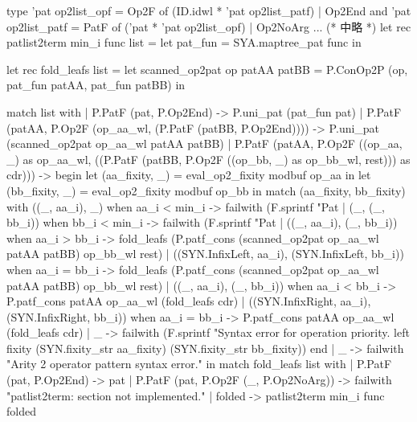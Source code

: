 \documentclass[mingoth,a4paper]{jsarticle}
\begin{document}
\begin{commandline}
  type 'pat op2list_opf =
      Op2F of (ID.idwl * 'pat op2list_patf)
    | Op2End
  and 'pat op2list_patf =
      PatF of ('pat * 'pat op2list_opf)
    | Op2NoArg
  ... (* 中略 *)
  let rec patlist2term min_i func list =
    let pat_fun = SYA.maptree_pat func in

    let rec fold_leafs list =
      let scanned_op2pat op patAA patBB =
        P.ConOp2P (op,
                   pat_fun patAA,
                   pat_fun patBB) in
        
        match list with
          | P.PatF (pat, P.Op2End) ->
              P.uni_pat (pat_fun pat)
          | P.PatF (patAA, P.Op2F (op_aa_wl, (P.PatF (patBB, P.Op2End)))) ->
              P.uni_pat (scanned_op2pat op_aa_wl patAA patBB)
          | P.PatF (patAA, P.Op2F ((op_aa, _) as op_aa_wl, ((P.PatF (patBB, P.Op2F ((op_bb, _) as op_bb_wl, rest))) as cdr))) ->
              begin
                let (aa_fixity, _) = eval_op2_fixity modbuf op_aa in
                let (bb_fixity, _) = eval_op2_fixity modbuf op_bb in
                  match (aa_fixity, bb_fixity) with
                      ((_, aa_i), _) when aa_i < min_i ->
                        failwith (F.sprintf "Pat%
                    | (_, (_, bb_i)) when bb_i < min_i ->
                        failwith (F.sprintf "Pat%
                    | ((_, aa_i), (_, bb_i)) when aa_i > bb_i ->
                        fold_leafs (P.patf_cons (scanned_op2pat op_aa_wl patAA patBB) op_bb_wl rest)
                    | ((SYN.InfixLeft, aa_i), (SYN.InfixLeft, bb_i)) when aa_i = bb_i ->
                        fold_leafs (P.patf_cons (scanned_op2pat op_aa_wl patAA patBB) op_bb_wl rest)
                    | ((_, aa_i), (_, bb_i)) when aa_i < bb_i ->
                        P.patf_cons patAA op_aa_wl (fold_leafs cdr)
                    | ((SYN.InfixRight, aa_i), (SYN.InfixRight, bb_i)) when aa_i = bb_i ->
                        P.patf_cons patAA op_aa_wl (fold_leafs cdr)
                    | _ ->
                        failwith (F.sprintf "Syntax error for operation priority. left fixity %
                                    (SYN.fixity_str aa_fixity)
                                    (SYN.fixity_str bb_fixity))
              end
          | _ -> failwith "Arity 2 operator pattern syntax error."
    in
      match fold_leafs list with
        | P.PatF (pat, P.Op2End) -> pat
        | P.PatF (pat, P.Op2F (_, P.Op2NoArg)) -> failwith "patlist2term: section not implemented."
        | folded -> patlist2term min_i func folded
\end{commandline}
\end{document}
